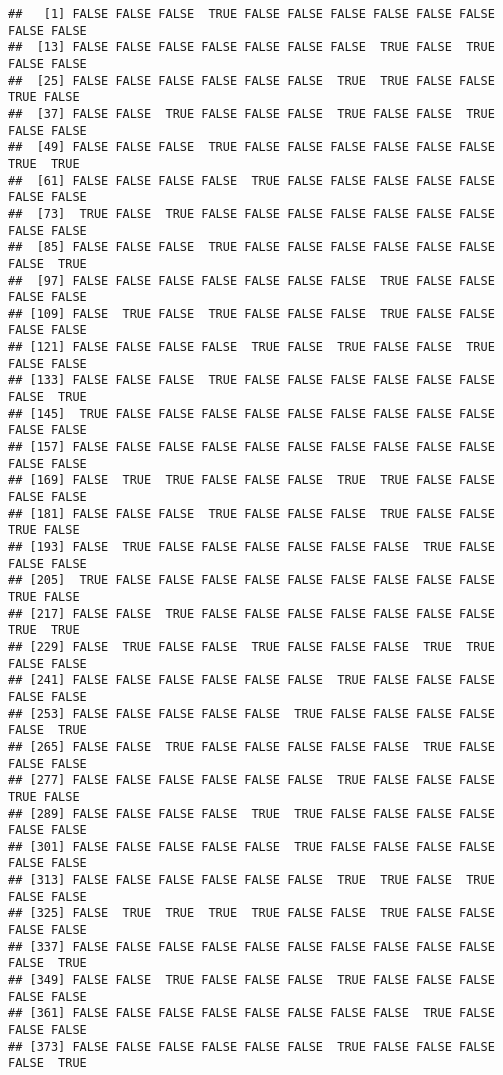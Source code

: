 \documentclass[
]{book}
\begin{document}
\begin{verbatim}
##   [1] FALSE FALSE FALSE  TRUE FALSE FALSE FALSE FALSE FALSE FALSE FALSE FALSE
##  [13] FALSE FALSE FALSE FALSE FALSE FALSE FALSE  TRUE FALSE  TRUE FALSE FALSE
##  [25] FALSE FALSE FALSE FALSE FALSE FALSE  TRUE  TRUE FALSE FALSE  TRUE FALSE
##  [37] FALSE FALSE  TRUE FALSE FALSE FALSE  TRUE FALSE FALSE  TRUE FALSE FALSE
##  [49] FALSE FALSE FALSE  TRUE FALSE FALSE FALSE FALSE FALSE FALSE  TRUE  TRUE
##  [61] FALSE FALSE FALSE FALSE  TRUE FALSE FALSE FALSE FALSE FALSE FALSE FALSE
##  [73]  TRUE FALSE  TRUE FALSE FALSE FALSE FALSE FALSE FALSE FALSE FALSE FALSE
##  [85] FALSE FALSE FALSE  TRUE FALSE FALSE FALSE FALSE FALSE FALSE FALSE  TRUE
##  [97] FALSE FALSE FALSE FALSE FALSE FALSE FALSE  TRUE FALSE FALSE FALSE FALSE
## [109] FALSE  TRUE FALSE  TRUE FALSE FALSE FALSE  TRUE FALSE FALSE FALSE FALSE
## [121] FALSE FALSE FALSE FALSE  TRUE FALSE  TRUE FALSE FALSE  TRUE FALSE FALSE
## [133] FALSE FALSE FALSE  TRUE FALSE FALSE FALSE FALSE FALSE FALSE FALSE  TRUE
## [145]  TRUE FALSE FALSE FALSE FALSE FALSE FALSE FALSE FALSE FALSE FALSE FALSE
## [157] FALSE FALSE FALSE FALSE FALSE FALSE FALSE FALSE FALSE FALSE FALSE FALSE
## [169] FALSE  TRUE  TRUE FALSE FALSE FALSE  TRUE  TRUE FALSE FALSE FALSE FALSE
## [181] FALSE FALSE FALSE  TRUE FALSE FALSE FALSE  TRUE FALSE FALSE  TRUE FALSE
## [193] FALSE  TRUE FALSE FALSE FALSE FALSE FALSE FALSE  TRUE FALSE FALSE FALSE
## [205]  TRUE FALSE FALSE FALSE FALSE FALSE FALSE FALSE FALSE FALSE  TRUE FALSE
## [217] FALSE FALSE  TRUE FALSE FALSE FALSE FALSE FALSE FALSE FALSE  TRUE  TRUE
## [229] FALSE  TRUE FALSE FALSE  TRUE FALSE FALSE FALSE  TRUE  TRUE FALSE FALSE
## [241] FALSE FALSE FALSE FALSE FALSE FALSE  TRUE FALSE FALSE FALSE FALSE FALSE
## [253] FALSE FALSE FALSE FALSE FALSE  TRUE FALSE FALSE FALSE FALSE FALSE  TRUE
## [265] FALSE FALSE  TRUE FALSE FALSE FALSE FALSE FALSE  TRUE FALSE FALSE FALSE
## [277] FALSE FALSE FALSE FALSE FALSE FALSE  TRUE FALSE FALSE FALSE  TRUE FALSE
## [289] FALSE FALSE FALSE FALSE  TRUE  TRUE FALSE FALSE FALSE FALSE FALSE FALSE
## [301] FALSE FALSE FALSE FALSE FALSE  TRUE FALSE FALSE FALSE FALSE FALSE FALSE
## [313] FALSE FALSE FALSE FALSE FALSE FALSE  TRUE  TRUE FALSE  TRUE FALSE FALSE
## [325] FALSE  TRUE  TRUE  TRUE  TRUE FALSE FALSE  TRUE FALSE FALSE FALSE FALSE
## [337] FALSE FALSE FALSE FALSE FALSE FALSE FALSE FALSE FALSE FALSE FALSE  TRUE
## [349] FALSE FALSE  TRUE FALSE FALSE FALSE  TRUE FALSE FALSE FALSE FALSE FALSE
## [361] FALSE FALSE FALSE FALSE FALSE FALSE FALSE FALSE  TRUE FALSE FALSE FALSE
## [373] FALSE FALSE FALSE FALSE FALSE FALSE  TRUE FALSE FALSE FALSE FALSE  TRUE

\end{verbatim}
\end{document}
